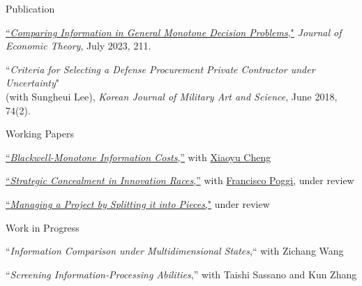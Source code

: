 \begin{rSection}{Publication}
	
	\begin{etaremune}
		\item \href{https://yonggyun-yg-kim.github.io/files/Research%20papers/GMDP_JET.pdf}{``\textit{Comparing Information in General Monotone Decision Problems},"} 
		\textit{Journal of Economic Theory}, July 2023, 211. 
		
		\item 
		``\textit{Criteria for Selecting a Defense Procurement Private Contractor under Uncertainty}"\\
		(with Sungheui Lee), \textit{Korean Journal of Military Art and Science}, June 2018, 74(2). 
	\end{etaremune}
	
	
	
\end{rSection}

\begin{rSection}{Working Papers}
	
	\begin{etaremune}
		
		\item \href{https://arxiv.org/pdf/2404.15158.pdf}{``\textit{Blackwell-Monotone Information Costs},''} with \href{https://xiaoyu-cheng.com/}{Xiaoyu Cheng}
		
		\item \href{https://yonggyun-yg-kim.github.io/files/Research%20papers/SCIR_public.pdf}{``\textit{Strategic Concealment in Innovation Races},''}   with \href{https://www.franciscopoggi.com/}{Francisco Poggi}, under review
		
		\item \href{https://ssrn.com/abstract=3450802}{``\textit{Managing a Project by Splitting it into Pieces},"} under review

	\end{etaremune}
	
	
\end{rSection}


\begin{rSection}{Work in Progress}
	\begin{etaremune}

		\item ``\textit{Information Comparison under Multidimensional States},`` with Zichang Wang

		\item 	``\textit{Screening Information-Processing Abilities},'' with Taishi Sassano and Kun Zhang

	\end{etaremune}
\end{rSection}



